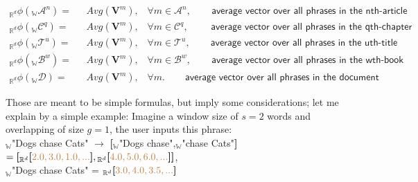\documentclass[a4paper,fleqn]{cas-sc}
\begin{document}
\begin{equation}
  \begin{split}
    {}_{\mathbb{R}^d}\phi({}_{\mathbb{W}}\mathcal{A}^{n}) =& \hspace{8pt} {Avg}\left(\mathbf{V}^{m}\right), \hspace{10pt} \forall m \in \mathcal{A}^{n}, \hspace{25pt} \textsf{average vector over all phrases in the nth-article}\\
    {}_{\mathbb{R}^d}\phi({}_{\mathbb{W}}\mathcal{C}^{q}) =& \hspace{8pt} {Avg}\left(\mathbf{V}^{m}\right), \hspace{10pt} \forall m \in \mathcal{C}^{q}, \hspace{28pt} \textsf{average vector over all phrases in the qth-chapter}\\
    {}_{\mathbb{R}^d}\phi({}_{\mathbb{W}}\mathcal{T}^{u}) =& \hspace{8pt} {Avg}\left(\mathbf{V}^{m}\right), \hspace{10pt} \forall m \in \mathcal{T}^{u}, \hspace{25pt} \textsf{average vector over all phrases in the uth-title}\\
    {}_{\mathbb{R}^d}\phi({}_{\mathbb{W}}\mathcal{B}^{w}) =& \hspace{8pt} {Avg}\left(\mathbf{V}^{m}\right), \hspace{10pt} \forall m \in \mathcal{B}^{w}, \hspace{25pt} \textsf{average vector over all phrases in the wth-book}\\
    {}_{\mathbb{R}^d}\phi({}_{\mathbb{W}}\mathcal{D}) =& \hspace{8pt} {Avg}\left(\mathbf{V}^{m}\right), \hspace{10pt} \forall m. \hspace{25pt} \textsf{average vector over all phrases in the document}
  \end{split}
\end{equation}

Those are meant to be simple formulas, but imply some considerations; let me explain by a simple example: 
Imagine a window size of $s=2$ words and overlapping of size $g=1$, the user inputs this phrase: \\
${}_{\mathbb{W}}$"\color{brown}Dogs chase Cats\color{black}" 
$\rightarrow$ 
\textbf{[}${}_{\mathbb{W}}$"\color{brown}Dogs chase\color{black}",${}_{\mathbb{W}}$"\color{brown}chase Cats\color{black}"\textbf{]} 
$=\textbf{[}{}_{\mathbb{R}^d}\textbf{[}\color{brown}2.0,3.0,1.0,...\color{black}\textbf{]}, 
{}_{\mathbb{R}^d}\textbf{[}\color{brown}4.0,5.0,6.0,...\color{black}\textbf{]}\textbf{]}$, \\
${}_{\mathbb{W}}$"\color{brown}Dogs chase Cats\color{black}" = ${}_{\mathbb{R}^d}\textbf{[}\color{brown}3.0,4.0,3.5,...\color{black}\textbf{]}$\\
\end{document}
